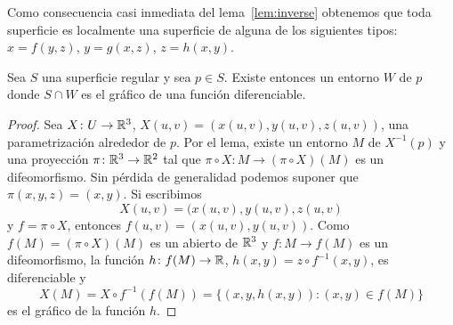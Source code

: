 Como consecuencia casi inmediata del lema~\ref{lem:inverse} obtenemos que
toda superficie es localmente una superficie de alguna de los siguientes tipos: 
$x=f(y,z)$, $y=g(x,z)$, $z=h(x,y)$. 

\begin{proposition}
	Sea $S$ una superficie regular y sea $p\in S$. Existe entonces un entorno
	$W$ de $p$ donde $S\cap W$ es el gráfico de una función diferenciable.
\end{proposition}

\begin{proof}
	Sea $X\colon U\to\mathbb{R}^3$, $X(u,v)=(x(u,v),y(u,v),z(u,v))$, una
	parametrización alrededor de $p$. Por el lema, existe un entorno $M$ de $X^{-1}(p)$ y una proyección
	$\pi\colon\mathbb{R}^3\to\mathbb{R}^2$ tal que $\pi\circ X\colon M\to (\pi\circ X)(M)$ es un difeomorfismo. Sin pérdida
	de generalidad podemos suponer que $\pi(x,y,z)=(x,y)$. Si escribimos
	\[
		X(u,v)=(x(u,v),y(u,v),z(u,v)
	\]
	y $f=\pi\circ X$, entonces $f(u,v)=(x(u,v),y(u,v))$. Como $f(M)=(\pi\circ
	X)(M)$ es un abierto de $\mathbb{R}^3$ y $f\colon M\to f(M)$ es un difeomorfismo, la función
	$h\colon f(M)\to\mathbb{R}$, $h(x,y)=z\circ f^{-1}(x,y)$, es diferenciable y 
	\[
		X(M)=X\circ f^{-1}(f(M))=\{(x,y,h(x,y)):(x,y)\in f(M)\}
	\]
	es el gráfico de la función $h$. 

\end{proof}

